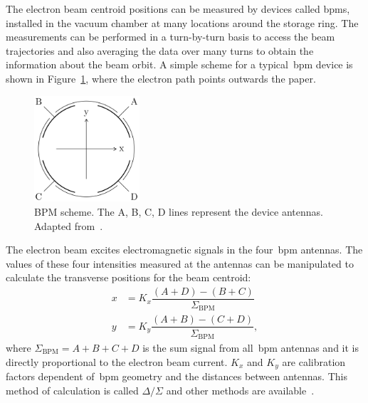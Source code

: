 The electron beam centroid positions can be measured by devices called \glspl{bpm}, installed in the vacuum chamber at many locations around the storage ring. The measurements can be performed in a turn-by-turn basis to access the beam trajectories and also averaging the data over many turns to obtain the information about the beam orbit. A simple scheme for a typical~\gls{bpm} device is shown in Figure~\ref{fig:bpm_scheme}, where the electron path points outwards the paper.
\begin{figure}
    \centering
    \includegraphics[width=0.35\textwidth]{figures/bpm_scheme.png}
    \caption{BPM scheme. The A, B, C, D lines represent the device antennas. Adapted from~\cite{huang2019beam}.}
    \label{fig:bpm_scheme}
\end{figure}

The electron beam excites electromagnetic signals in the four~\gls{bpm} antennas. The values of these four intensities measured at the antennas can be manipulated to calculate the transverse positions for the beam centroid:
\begin{align}
    x &= K_x \dfrac{\left(A + D\right) - \left(B + C\right)}{\Sigma_{\mathrm{BPM}}} \\
    y &= K_y \dfrac{\left(A + B\right) - \left(C + D\right)}{\Sigma_{\mathrm{BPM}}},
\end{align}
where $\Sigma_{\mathrm{BPM}} = A + B + C + D$ is the sum signal from all~\gls{bpm} antennas and it is directly proportional to the electron beam current. $K_x$ and $K_y$ are calibration factors dependent of~\gls{bpm} geometry and the distances between antennas. This method of calculation is called $\Delta/\Sigma$ and other methods are available~\cite{wikibpm}.

